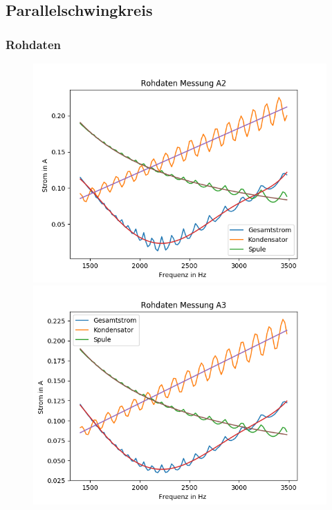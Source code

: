 \documentclass[12pt,a4paper]{article}
\begin{document}
\newpage
\subsection{Parallelschwingkreis}
\subsubsection{Rohdaten}
\begin{figure}[H]
\centering
\includegraphics[scale=0.65]{Bilder/Parallel_Rohdaten_2.png}
\includegraphics[scale=0.65]{Bilder/Parallel_Rohdaten_3.png}

\end{figure}
\end{document}
